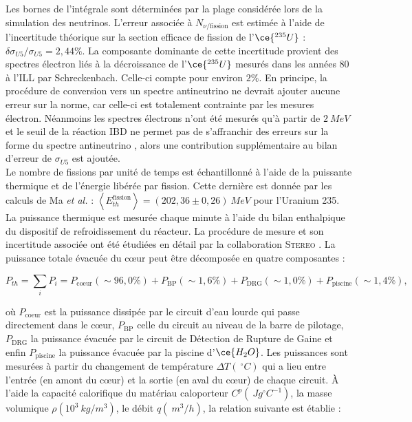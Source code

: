 Les bornes de l'intégrale sont déterminées par la plage considérée lors de la simulation des neutrinos. L'erreur associée à $N_{\nu / \textrm{fission}}$ est estimée à l'aide de l'incertitude théorique sur la section efficace de fission de l'$\ce{^{235}U}$ \cite{Gariazzo:2017fdh} : $\delta \sigma_{U5} / \sigma_{U5} = 2,44 \%$. La composante dominante de cette incertitude provient des spectres électron liés à la décroissance de l'$\ce{^{235}U}$ mesurés dans les années 80 à l'ILL par Schreckenbach. Celle-ci compte pour environ $2\%$. En principe, la procédure de conversion vers un spectre antineutrino ne devrait ajouter aucune erreur sur la norme, car celle-ci est totalement contrainte par les mesures électron. Néanmoins les spectres électrons n'ont été mesurés qu'à partir de $\SI{2}{MeV}$ \cite{Schreckenbach:1985ep} et le seuil de la réaction IBD ne permet pas de s'affranchir des erreurs sur la forme du spectre antineutrino \cite{Huber:2011wv}, alors  une contribution supplémentaire au bilan d'erreur de $\sigma_{U5}$ est ajoutée.\\

Le nombre de fissions par unité de temps est échantillonné à l'aide de la puissante thermique et de l'énergie libérée par fission. Cette dernière est donnée par les calculs de Ma \textit{et al.} \cite{PhysRevC.88.014605} : $\left<E_{th}^{\textrm{fission}}\right> = (202,36 \pm 0,26) \SI{}{MeV}$ pour l'Uranium 235. La puissance thermique est mesurée chaque minute à l'aide du bilan enthalpique du dispositif de refroidissement du réacteur. La procédure de mesure et son incertitude associée ont été étudiées en détail par la collaboration \textsc{Stereo} \cite{docdb342}. La puissance totale évacuée du c\oe ur peut être décomposée en quatre composantes :

\begin{equation}
    P_{th} = \sum_i P_i = P_\textrm{coeur} (\sim 96,0 \%) + P_\textrm{BP} (\sim 1,6 \%) + P_\textrm{DRG} (\sim 1,0 \%) + P_\textrm{piscine} (\sim 1,4 \%),
\end{equation}

\bigbreak

où $P_\textrm{coeur}$ est la puissance dissipée par le circuit d'eau lourde qui passe directement dans le c\oe ur, $P_\textrm{BP}$ celle du circuit au niveau de la barre de pilotage, $P_\textrm{DRG}$ la puissance évacuée par le circuit de Détection de Rupture de Gaine et enfin $P_\textrm{piscine}$ la puissance évacuée par la piscine d'$\ce{H_2O}$. Les puissances sont mesurées à partir du changement de température $\Delta T (\SI{}{^\circ C})$ qui a lieu entre l'entrée (en amont du c\oe ur) et la sortie (en aval du c\oe ur) de chaque circuit. À l'aide la capacité calorifique du matériau caloporteur $C^p (\SI{}{Jg ^\circ C^{-1}})$, la masse volumique $\rho (10^3 \SI{}{kg/m^3})$, le débit $q (\SI{}{m^3/h})$, la relation suivante est établie :

